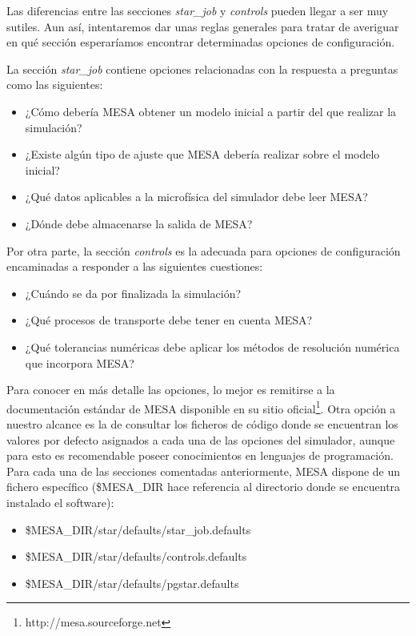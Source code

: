 Las diferencias entre las secciones \textit{star\_job} y \textit{controls} pueden llegar a ser muy sutiles. Aun así, intentaremos dar unas reglas generales para tratar de averiguar en qué sección esperaríamos encontrar determinadas opciones de configuración.\par

La sección \textit{star\_job} contiene opciones relacionadas con la respuesta a preguntas como las siguientes:
\begin{itemize}
    \item ¿Cómo debería MESA obtener un modelo inicial a partir del que realizar la simulación?
    \item ¿Existe algún tipo de ajuste que MESA debería realizar sobre el modelo inicial?
    \item ¿Qué datos aplicables a la microfísica del simulador debe leer MESA?
    \item ¿Dónde debe almacenarse la salida de MESA?
\end{itemize}

Por otra parte, la sección \textit{controls} es la adecuada para opciones de configuración encaminadas a responder a las siguientes cuestiones:
\begin{itemize}
    \item ¿Cuándo se da por finalizada la simulación?
    \item ¿Qué procesos de transporte debe tener en cuenta MESA?
    \item ¿Qué tolerancias numéricas debe aplicar los métodos de resolución numérica que incorpora MESA?
\end{itemize}

Para conocer en más detalle las opciones, lo mejor es remitirse a la documentación estándar de MESA disponible en su sitio oficial\footnote{http://mesa.sourceforge.net}. Otra opción a nuestro alcance es la de consultar los ficheros de código donde se encuentran los valores por defecto asignados a cada una de las opciones del simulador, aunque para esto es recomendable poseer conocimientos en lenguajes de programación. Para cada una de las secciones comentadas anteriormente, MESA dispone de un fichero específico (\$MESA\_DIR hace referencia al directorio donde se encuentra instalado el software):
\begin{itemize}
    \item \$MESA\_DIR/star/defaults/star\_job.defaults
    \item \$MESA\_DIR/star/defaults/controls.defaults
    \item \$MESA\_DIR/star/defaults/pgstar.defaults
\end{itemize}

